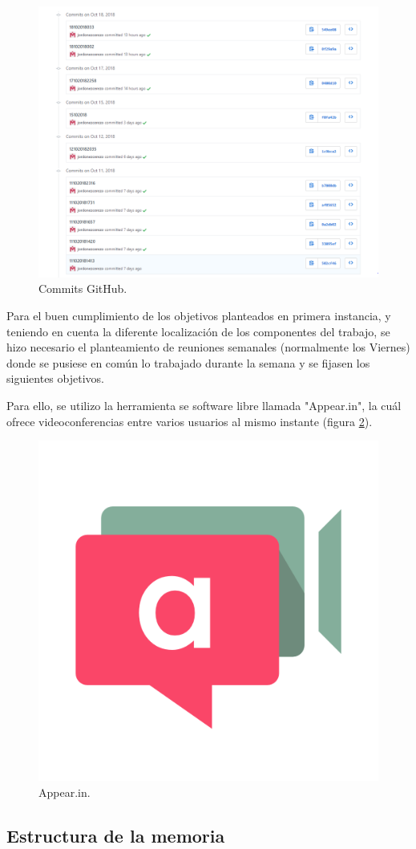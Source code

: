 \begin{figure}[H]
	\center
	\includegraphics[trim = 0mm 0mm 0mm 0mm, clip,scale=0.5]{imagenes/Introduction/CapturaGit}
	\caption{Commits GitHub.}
	\label{fig:capturaGit}
\end{figure}

Para el buen cumplimiento de los objetivos planteados en primera instancia, y teniendo en cuenta la diferente localización de los componentes del trabajo, se hizo necesario el planteamiento de reuniones semanales (normalmente los Viernes) donde se pusiese en común lo trabajado durante la semana y se fijasen los siguientes objetivos. \newline

Para ello, se utilizo la herramienta se software libre llamada "Appear.in", la cuál ofrece videoconferencias entre varios usuarios al mismo instante (figura \ref{fig:appear}). 

\begin{figure}[H]
	\center
	\includegraphics[trim = 0mm 0mm 0mm 0mm, clip,scale=0.3]{imagenes/Introduction/appear}
	\caption{Appear.in.}
	\label{fig:appear}
\end{figure}

\subsection{Estructura de la memoria}